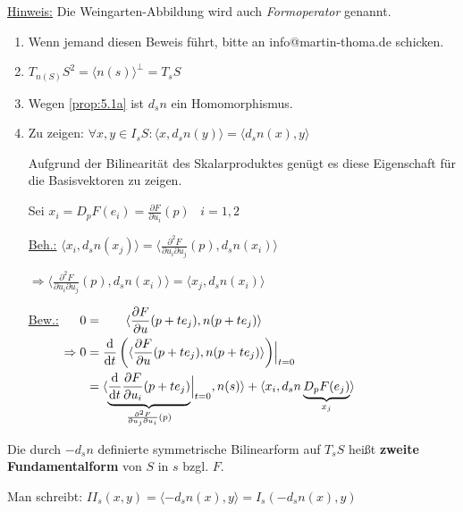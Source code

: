 \underline{Hinweis:} Die Weingarten-Abbildung wird auch \textit{Formoperator} genannt.
\clearpage
\begin{beweis}\leavevmode
    \begin{enumerate}[label=\alph*)]
        \item Wenn jemand diesen Beweis führt, bitte an info@martin-thoma.de
              schicken.
        \item $T_{n(S)} S^2 = \langle n(s) \rangle^\perp = T_s S$
        \item Wegen \cref{prop:5.1a} ist $d_s n$ ein Homomorphismus.%
        \item Zu zeigen: $\forall x,y \in I_s S: \langle x, d_s n (y) \rangle = \langle d_s n(x), y \rangle$

        Aufgrund der Bilinearität des Skalarproduktes genügt es diese Eigenschaft
        für die Basisvektoren zu zeigen.

        Sei $x_i = D_p F(e_i) = \frac{\partial F}{\partial u_i} (p)\;\;\; i = 1,2$

        \underline{Beh.:}
          $\langle x_i, d_s n(x_j) \rangle = \langle \frac{\partial^2 F}{\partial u_i \partial u_j} (p), d_s n (x_i) \rangle$

        $\Rightarrow \langle \frac{\partial^2 F}{\partial u_i \partial u_j} (p), d_s n (x_i) \rangle = \langle x_j, d_s n (x_i) \rangle$

        \underline{Bew.:} $
        \begin{aligned}[t]
            0 &= \hphantom{\frac{\mathrm{d}}{\mathrm{d}t} \left (\right.} \langle \frac{\partial F}{\partial u} (p + t e_j), n(p + t e_j) \rangle\\
\Rightarrow 0 &= \frac{\mathrm{d}}{\mathrm{d}t} \left (\langle \frac{\partial F}{\partial u} (p + t e_j), n(p + t e_j) \rangle \right) \Bigr |_{t=0}\\
              &= \langle \underbrace{\frac{\mathrm{d}}{\mathrm{d}t} \frac{\partial F}{\partial u_i} (p + t e_j)}_{\frac{\partial^2 F}{\partial u_j \partial u_i} (p)} \Bigr |_{t=0}, n(s) \rangle + \langle x_i, d_s n \underbrace{D_p F (e_j)}_{x_j}\rangle
        \end{aligned}$
    \end{enumerate}
\end{beweis}

\begin{definition}%
    Die durch $-d_s n$ definierte symmetrische Bilinearform auf $T_s S$ heißt
    \textbf{zweite Fundamentalform} von $S$ in $s$ bzgl. $F$.

    Man schreibt: $II_s(x,y) =  \langle - d_s n(x), y \rangle = I_s (-d_s n(x), y)$
\end{definition}

